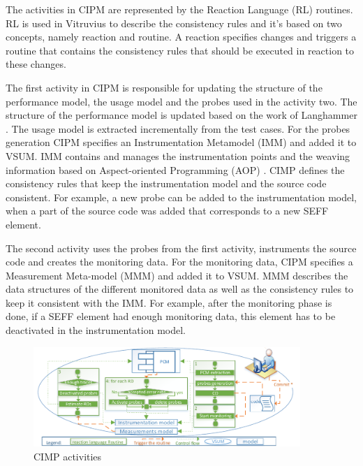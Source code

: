 The activities in CIPM are represented by the Reaction Language (RL) routines. RL is used in Vitruvius to describe the consistency rules and it's based on two concepts, namely reaction and routine. A reaction specifies changes and triggers a routine that contains the consistency rules that should be executed in reaction to these changes.  

The first activity in CIPM is responsible for updating the structure of the performance model, the usage model and the probes used in the activity two. The structure of the performance model is updated based on the work of Langhammer \cite{langhammer2015co}. The usage model is extracted incrementally from the test cases. For the probes generation CIPM specifies an Instrumentation Metamodel (IMM) and added it to VSUM. IMM contains and manages the instrumentation points and the weaving information based on Aspect-oriented Programming (AOP) \cite{kiczales1997j}. CIMP defines the consistency rules that keep the instrumentation model and the source code consistent. For example, a new probe can be added to the instrumentation model, when a part of the source code was added that corresponds to a new SEFF element. 

The second activity uses the probes from the first activity, instruments the source code and creates the monitoring data. For the monitoring data, CIPM specifies a Measurement Meta-model (MMM) and added it to VSUM. MMM describes the data structures of the different monitored data as well as the consistency rules to keep it consistent with the IMM. For example, after the monitoring phase is done, if a SEFF element had enough monitoring data, this element has to be deactivated in the instrumentation model. 

\begin{figure}[h]
\centering
\includegraphics[width=0.9\textwidth]{figures/cipm}
\caption{CIMP activities \cite{mazkatli2018continuous}}
\label{fig:CIMP activities}
\end{figure} 


